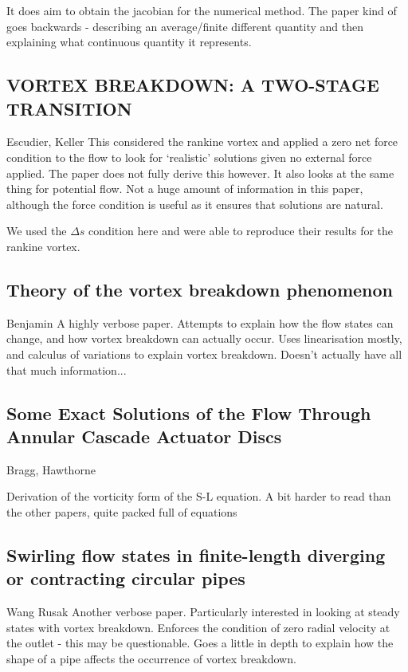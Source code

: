 \documentclass{X:/Documents/Coding/Latex/myreport}
\begin{document}
It does aim to obtain the jacobian for the numerical method. The paper kind of goes backwards - describing an average/finite different quantity and then explaining what continuous quantity it represents.
\subsection{VORTEX BREAKDOWN: A TWO-STAGE TRANSITION}
Escudier, Keller
This considered the rankine vortex and applied a zero net force condition to the flow to look for `realistic' solutions given no external force applied. The paper does not fully derive this however. 
It also looks at the same thing for potential flow. Not a huge amount of information in this paper, although the force condition is useful as it ensures that solutions are natural.

We used the $\Delta s$ condition here and were able to reproduce their results for the rankine vortex.


\subsection{Theory of the vortex breakdown phenomenon}
Benjamin
A highly verbose paper. Attempts to explain how the flow states can change, and how vortex breakdown can actually occur. Uses linearisation mostly, and calculus of variations to explain vortex breakdown.
Doesn't actually have all that much information...


\subsection{Some Exact Solutions of the Flow Through Annular Cascade Actuator Discs}
Bragg, Hawthorne

Derivation of the vorticity form of the S-L equation.
A bit harder to read than the other papers, quite packed full of equations



\subsection{Swirling flow states in finite-length diverging or contracting circular pipes}
Wang Rusak
Another verbose paper. Particularly interested in looking at steady states with vortex breakdown. 
Enforces the condition of zero radial velocity at the outlet - this may be questionable.
Goes a little in depth to explain how the shape of a pipe affects the occurrence of vortex breakdown.
\end{document}
